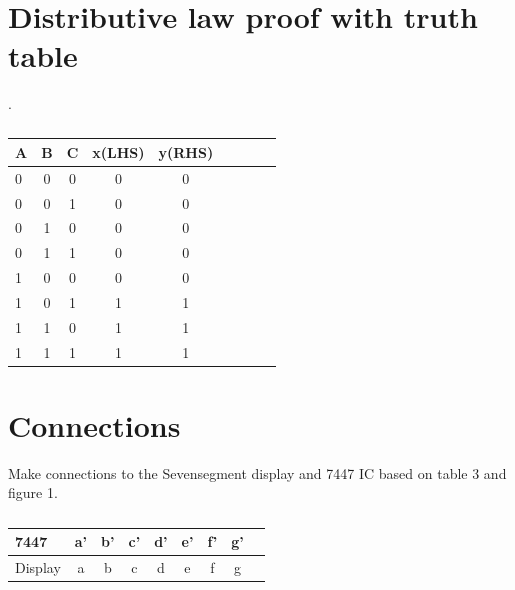 \documentclass[10pt, a4paper]{article}
\begin{document}
\section{Distributive law proof with truth table}
.


\begin{table}[htbp]
 \begin{center}
    \begin{tabular}{|l|c|c|c|c|c|c|c|c} \hline \textbf{A}
  & \textbf{B} & \textbf{C} & \textbf{x(LHS)}& \textbf{y(RHS)} \\
 \hline
0&0&0&0&0 \\ \hline
0&0&1&0&0 \\ \hline
0&1&0&0&0\\ \hline
0&1&1&0&0  \\ \hline
1&0&0&0&0 \\ \hline
1&0&1&1&1\\ \hline
1&1&0&1&1\\ \hline
1&1&1&1&1\\ \hline
\end{tabular}   
\end{center}
\caption{\label{table:dummytable} }
\end{table}







\section{Connections}

Make connections to the Sevensegment display and 7447 IC based on table 3 and figure 1.


\begin{table}[htbp]
 \begin{center}
    \begin{tabular}{|l|c|c|c|c|c|c|c|c} \hline \textbf{7447}
  & \textbf{a'} & \textbf{b'} & \textbf{c'}& \textbf{d'}& \textbf{e'}& \textbf{f'}& \textbf{g'} \\
 \hline
Display&a&b&c&d&e&f&g \\ \hline

\end{tabular}   
\end{center}
\caption{\label{table:dummytable} }
\end{table}
\end{document}
